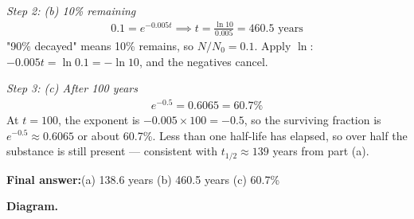 \documentclass[11pt]{article}
\begin{document}
\textit{Step 2: (b) 10\% remaining}
\[\begin{gathered}
0.1 = e^{-0.005t} \implies t = \frac{\ln 10}{0.005} = 460.5 \text{ years}
\end{gathered}\]
"90\% decayed" means 10\% remains, so \( N/N_0 = 0.1 \). Apply \( \ln \): \( -0.005t = \ln 0.1 = -\ln 10 \), and the negatives cancel.

\textit{Step 3: (c) After 100 years}
\[\begin{gathered}
e^{-0.5} = 0.6065 = 60.7\%
\end{gathered}\]
At \( t = 100 \), the exponent is \( -0.005 \times 100 = -0.5 \), so the surviving fraction is \( e^{-0.5} \approx 0.6065 \) or about 60.7\%. Less than one half-life has elapsed, so over half the substance is still present --- consistent with \( t_{1/2} \approx 139 \) years from part (a).

\begin{answerbox}
\textbf{Final answer:}\quad (a) 138.6 years (b) 460.5 years (c) 60.7\%
\end{answerbox}
\textbf{Diagram.}
\end{document}
